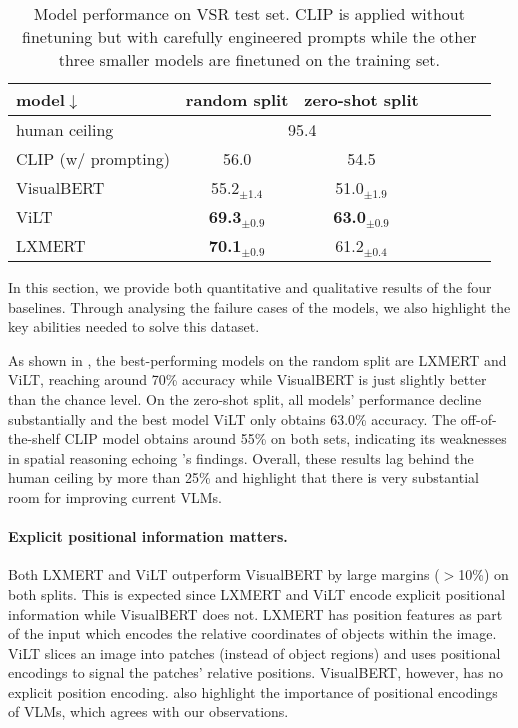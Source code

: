\begin{table}[ht]
\centering
\small
\begin{tabular}{lcccccc}
\toprule
model$\downarrow$ & random split & zero-shot split \\
\midrule
human ceiling & \multicolumn{2}{c}{95.4}   \\
\midrule
CLIP {\scriptsize(w/ prompting)} & 56.0 & 54.5 \\
\midrule
VisualBERT &  55.2$_{\pm1.4}$ & 51.0$_{\pm1.9}$  \\ 
ViLT & \textbf{69.3}$_{\pm0.9}$ &  \textbf{63.0}$_{\pm0.9}$  \\ 
LXMERT & \textbf{70.1}$_{\pm0.9}$ & 61.2$_{\pm0.4}$  \\ 
\bottomrule
\end{tabular}
\caption{Model performance on VSR test set. CLIP is applied without finetuning but with carefully engineered prompts while the other three smaller models are finetuned on the training set.}
\label{table:results}
\end{table}

In this section, we provide both quantitative and qualitative results of the four baselines. Through analysing the failure cases of the models, we also highlight the key abilities needed to solve this dataset.

As shown in , the best-performing models on the random split are LXMERT and ViLT, reaching around 70\% accuracy while VisualBERT is just slightly better than the chance level. On the zero-shot split, all models' performance decline substantially and the best model ViLT only obtains 63.0\% accuracy.
The off-of-the-shelf CLIP model obtains around 55\% on both sets, indicating its weaknesses in spatial reasoning echoing \citet{subramanian2022reclip}'s findings.
Overall, these results lag behind the human ceiling by more than 25\% and highlight that there is very substantial room for improving current VLMs. 

\paragraph{Explicit positional information matters.} Both LXMERT and ViLT outperform VisualBERT by large margins ($>$10\%) on both splits.
This is expected since LXMERT and ViLT encode explicit positional information while VisualBERT does not. LXMERT has position features as part of the input which encodes the relative coordinates of objects within the image. ViLT slices an image into patches (instead of object regions) and uses positional encodings to signal the patches' relative positions.
VisualBERT, however, has no explicit position encoding. \citet{bugliarello-etal-2021-multimodal,positional2022} also highlight the importance of positional encodings of VLMs, which agrees with our observations.

